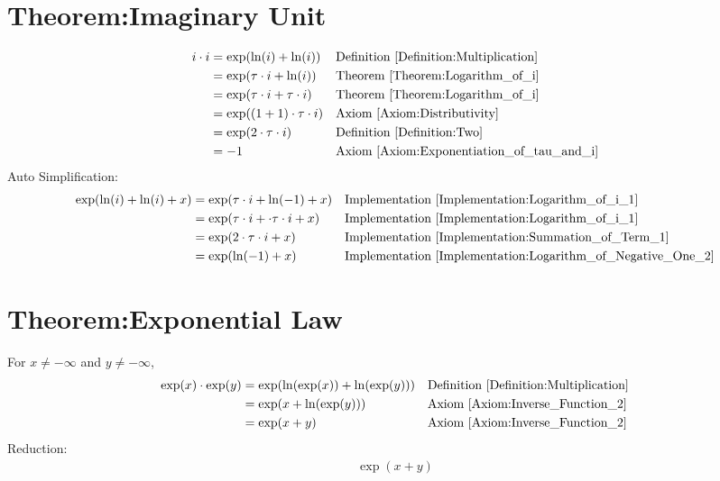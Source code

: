 \documentclass[12pt,a4paper]{report}
\begin{document}
\section{Theorem:Imaginary Unit}
\label{Theorem:Imaginary_Unit}
\begin{align*}
i \cdot i
&= \exp(\ln(i) + \ln(i))
&& \text{Definition \ref{Definition:Multiplication}} \\
&= \exp(\tau \cdot i + \ln(i))
&& \text{Theorem \ref{Theorem:Logarithm_of_i}} \\
&= \exp(\tau \cdot i + \tau \cdot i)
&& \text{Theorem \ref{Theorem:Logarithm_of_i}} \\
&= \exp((1+1) \cdot \tau \cdot i)
&& \text{Axiom \ref{Axiom:Distributivity}} \\
&= \exp(2 \cdot \tau \cdot i)
&& \text{Definition \ref{Definition:Two}} \\
&= -1
&& \text{Axiom \ref{Axiom:Exponentiation_of_tau_and_i}} \\
\end{align*}
Auto Simplification:
\begin{align*}
\exp(\ln(i) + \ln(i) + x)
&= \exp(\tau \cdot i + \ln(-1) + x)
&& \text{Implementation \ref{Implementation:Logarithm_of_i_1}} \\
&= \exp(\tau \cdot i + \cdot \tau \cdot i + x)
&& \text{Implementation \ref{Implementation:Logarithm_of_i_1}} \\
&= \exp(2 \cdot \tau \cdot i + x)
&& \text{Implementation \ref{Implementation:Summation_of_Term_1}} \\
&= \exp(\ln(-1) + x)
&& \text{Implementation \ref{Implementation:Logarithm_of_Negative_One_2}} \\
\end{align*}

\section{Theorem:Exponential Law}
\label{Theorem:Exponential_Law}
For $x \neq -\infty$ and $y \neq -\infty$,
\begin{align*}
\exp(x) \cdot \exp(y)
&= \exp(\ln(\exp(x)) + \ln(\exp(y)))
&& \text{Definition \ref{Definition:Multiplication}} \\
&= \exp(x + \ln(\exp(y)))
&& \text{Axiom \ref{Axiom:Inverse_Function_2}} \\
&= \exp(x + y)
&& \text{Axiom \ref{Axiom:Inverse_Function_2}} \\
\end{align*}
Reduction:
\begin{align*}
\exp(x + y)
\end{align*}
\end{document}
